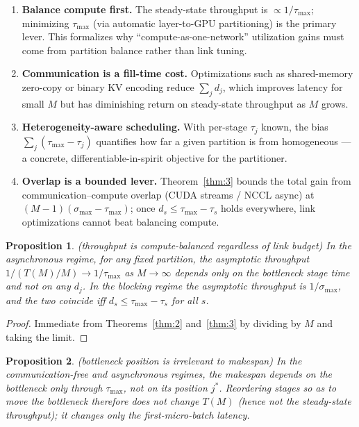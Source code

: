 \documentclass[11pt]{article}
\newtheorem{proposition}{Proposition}
\begin{document}
\begin{enumerate}
\item \textbf{Balance compute first.} The steady-state throughput is $\propto 1/\tau_{\max}$; minimizing $\tau_{\max}$ (via automatic layer-to-GPU partitioning) is the primary lever. This formalizes why ``compute-as-one-network'' utilization gains must come from partition balance rather than link tuning.
\item \textbf{Communication is a fill-time cost.} Optimizations such as shared-memory zero-copy or binary KV encoding reduce $\sum_j d_j$, which improves latency for small $M$ but has diminishing return on steady-state throughput as $M$ grows.
\item \textbf{Heterogeneity-aware scheduling.} With per-stage $\tau_j$ known, the bias $\sum_j(\tau_{\max}-\tau_j)$ quantifies how far a given partition is from homogeneous --- a concrete, differentiable-in-spirit objective for the partitioner.
\item \textbf{Overlap is a bounded lever.} Theorem~\ref{thm:3} bounds the total gain from communication--compute overlap (CUDA streams / NCCL async) at $(M-1)(\sigma_{\max}-\tau_{\max})$; once $d_s\le\tau_{\max}-\tau_s$ holds everywhere, link optimizations cannot beat balancing compute.
\end{enumerate}

\begin{proposition}\label{prop:1}(throughput is compute-balanced regardless of link budget)
In the asynchronous regime, for any fixed partition, the asymptotic throughput $1/(T(M)/M)\to 1/\tau_{\max}$ as $M\to\infty$ depends only on the bottleneck stage time and not on any $d_j$. In the blocking regime the asymptotic throughput is $1/\sigma_{\max}$, and the two coincide iff $d_s\le\tau_{\max}-\tau_s$ for all $s$.
\end{proposition}

\begin{proof}
Immediate from Theorems~\ref{thm:2} and~\ref{thm:3} by dividing by $M$ and taking the limit.
\end{proof}

\begin{proposition}\label{prop:2}(bottleneck position is irrelevant to makespan)
In the communication-free and asynchronous regimes, the makespan depends on the bottleneck only through $\tau_{\max}$, not on its position $j^*$. Reordering stages so as to move the bottleneck therefore does not change $T(M)$ (hence not the steady-state throughput); it changes only the first-micro-batch latency.
\end{proposition}
\end{document}
